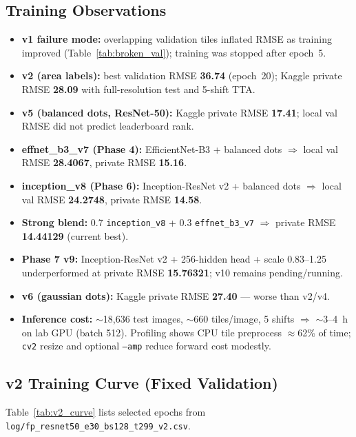 \documentclass[12pt, a4paper]{article}
\begin{document}
\subsection{Training Observations}
\begin{itemize}
    \item \textbf{v1 failure mode:} overlapping validation tiles inflated RMSE as training improved (Table~\ref{tab:broken_val}); training was stopped after epoch~5.
    \item \textbf{v2 (area labels):} best validation RMSE \textbf{36.74} (epoch~20); Kaggle private RMSE \textbf{28.09} with full-resolution test and 5-shift TTA.
    \item \textbf{v5 (balanced dots, ResNet-50):} Kaggle private RMSE \textbf{17.41}; local val RMSE did not predict leaderboard rank.
    \item \textbf{effnet\_b3\_v7 (Phase 4):} EfficientNet-B3 + balanced dots $\Rightarrow$ local val RMSE \textbf{28.4067}, private RMSE \textbf{15.16}.
    \item \textbf{inception\_v8 (Phase 6):} Inception-ResNet v2 + balanced dots $\Rightarrow$ local val RMSE \textbf{24.2748}, private RMSE \textbf{14.58}.
    \item \textbf{Strong blend:} 0.7 \texttt{inception\_v8} + 0.3 \texttt{effnet\_b3\_v7} $\Rightarrow$ private RMSE \textbf{14.44129} (current best).
    \item \textbf{Phase 7 v9:} Inception-ResNet v2 + 256-hidden head + scale 0.83--1.25 underperformed at private RMSE \textbf{15.76321}; v10 remains pending/running.
    \item \textbf{v6 (gaussian dots):} Kaggle private RMSE \textbf{27.40} --- worse than v2/v4.
    \item \textbf{Inference cost:} $\sim$18{,}636 test images, $\sim$660 tiles/image, 5 shifts $\Rightarrow$ $\sim$3--4~h on lab GPU (batch 512). Profiling shows CPU tile preprocess $\approx$62\% of time; \texttt{cv2} resize and optional \texttt{--amp} reduce forward cost modestly.
\end{itemize}

\subsection{v2 Training Curve (Fixed Validation)}
Table~\ref{tab:v2_curve} lists selected epochs from \texttt{log/fp\_resnet50\_e30\_bs128\_t299\_v2.csv}.
\end{document}
